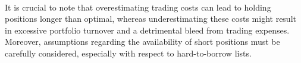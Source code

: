 \begin{remark} \\
It is crucial to note that overestimating trading costs can lead to holding positions longer than optimal, whereas underestimating these costs might result in excessive portfolio turnover and a detrimental bleed from trading expenses. Moreover, assumptions regarding the availability of short positions must be carefully considered, especially with respect to hard-to-borrow lists.
\end{remark}
